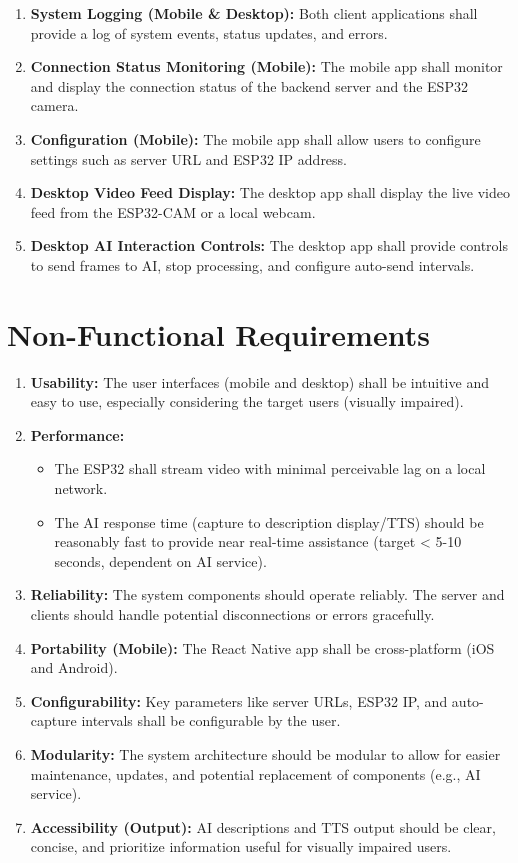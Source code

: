 \documentclass[12pt, a4paper]{report}
\begin{document}
\begin{enumerate}[label=FR\arabic*:]
    \item \textbf{System Logging (Mobile \& Desktop):} Both client applications shall provide a log of system events, status updates, and errors.
    \item \textbf{Connection Status Monitoring (Mobile):} The mobile app shall monitor and display the connection status of the backend server and the ESP32 camera.
    \item \textbf{Configuration (Mobile):} The mobile app shall allow users to configure settings such as server URL and ESP32 IP address.
    \item \textbf{Desktop Video Feed Display:} The desktop app shall display the live video feed from the ESP32-CAM or a local webcam.
    \item \textbf{Desktop AI Interaction Controls:} The desktop app shall provide controls to send frames to AI, stop processing, and configure auto-send intervals.
\end{enumerate}

\section{Non-Functional Requirements}
\begin{enumerate}[label=NFR\arabic*:]
    \item \textbf{Usability:} The user interfaces (mobile and desktop) shall be intuitive and easy to use, especially considering the target users (visually impaired).
    \item \textbf{Performance:}
        \begin{itemize}
            \item The ESP32 shall stream video with minimal perceivable lag on a local network.
            \item The AI response time (capture to description display/TTS) should be reasonably fast to provide near real-time assistance (target < 5-10 seconds, dependent on AI service).
        \end{itemize}
    \item \textbf{Reliability:} The system components should operate reliably. The server and clients should handle potential disconnections or errors gracefully.
    \item \textbf{Portability (Mobile):} The React Native app shall be cross-platform (iOS and Android).
    \item \textbf{Configurability:} Key parameters like server URLs, ESP32 IP, and auto-capture intervals shall be configurable by the user.
    \item \textbf{Modularity:} The system architecture should be modular to allow for easier maintenance, updates, and potential replacement of components (e.g., AI service).
    \item \textbf{Accessibility (Output):} AI descriptions and TTS output should be clear, concise, and prioritize information useful for visually impaired users.
\end{enumerate}
\end{document}
